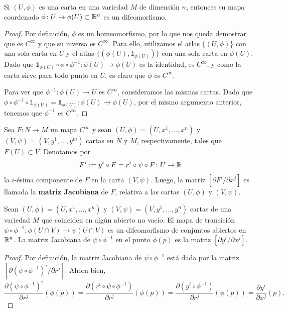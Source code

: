 \begin{proposition}
	Si $(U,\phi)$ es una carta en una variedad $M$ de dimensión $n$, entonces su mapa coordenado $\phi \colon U \to \phi(U) \subset \mathbb{R}^{n}$ es un difeomorfismo.
\end{proposition}
\begin{proof}
	Por definición, $\phi$ es un homeomorfismo, por lo que nos queda demostrar que es $C^{\infty}$ y que su inversa es $C^{\infty}$. Para ello, utilizamos el atlas $\{ (U,\phi) \}$ con una sola carta en $U$ y el atlas $\{ (\phi(U), \mathds{1}_{\phi(U)}) \}$ con una sola carta en $\phi(U)$. Dado que $\mathds{1}_{\phi(U)} \circ \phi \circ \phi^{-1} \colon \phi(U) \to \phi(U)$ es la identidad, es $C^{\infty}$, y como la carta sirve para todo punto en $U$, es claro que $\phi$ es $C^{\infty}$. \par
	Para ver que $\phi^{-1} \colon \phi(U) \to U$ es $C^{\infty}$, consideramos las mismas cartas. Dado que $\phi \circ \phi^{-1} \circ \mathds{1}_{\phi(U)} = \mathds{1}_{\phi(U)} \colon \phi(U) \to \phi(U)$, por el mismo argumento anterior, tenemos que $\phi^{-1}$ es $C^{\infty}$.
\end{proof}

\begin{definition}
	Sea $F \colon N \to M$ un mapa $C^{\infty}$ y sean $(U, \phi) = (U, x^{1},\dots,x^{n})$ y $(V, \psi) = (V, y^{1},\dots,y^{m})$ cartas en $N$ y $M$, respectivamente, tales que $F(U) \subset V$. Denotamos por
	\[ F^{i} := y^{i} \circ F = r^{i} \circ \psi \circ F \colon U \to \mathbb{R} \]
	la $i$-ésima componente de $F$ en la carta $(V,\psi)$. Luego, la matriz $[\partial F^{i} \slash \partial x^{j}]$ es llamada la \textbf{matriz Jacobiana} de $F$, relativa a las cartas $(U,\phi)$ y $(V,\psi)$.
\end{definition}

\begin{example}
	Sean $(U,\phi) = (U,x^{1},\dots,x^{n})$ y $(V,\psi) = (V,y^{1},\dots,y^{n})$ cartas de una variedad $M$ que coinciden en algún abierto no vacío. El mapa de transición $\psi \circ \phi^{-1} \colon \phi(U \cap V) \to \psi(U \cap V)$ es un difeomorfismo de conjuntos abiertos en $\mathbb{R}^{n}$. La matriz Jacobiana de $\psi \circ \phi^{-1}$ en el punto $\phi(p)$ es la matriz $[\partial y^{i} \slash \partial x^{j}]$.
\end{example}
\begin{proof}
	Por definición, la matriz Jacobiana de $\psi \circ \phi^{-1}$ está dada por la matriz $[\partial (\psi \circ \phi^{-1})^{i} \slash \partial r^{j}]$. Ahora bien,
	\[ \frac{\partial (\psi \circ \phi^{-1})^{i}}{\partial r^{j}}(\phi(p)) = \frac{\partial (r^{i} \circ \psi \circ \phi^{-1})}{\partial r^{j}} (\phi(p)) = \frac{\partial (y^{i} \circ \phi^{-1})}{\partial r^{j}} (\phi(p)) = \frac{\partial y^{i}}{\partial x^{j}}(p). \]
\end{proof}


